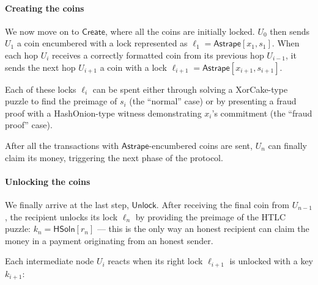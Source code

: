 \documentclass[USenglish,oneside,twocolumn]{article}
\begin{document}
\paragraph*{Creating the coins}

We now move on to $\mathsf{Create}$, where all the coins are initially locked. $U_0$ then sends $U_1$ a coin encumbered with a lock represented as $\ell_1 = \mathsf{Astrape}[x_1,s_1]$. When each hop $U_i$ receives a correctly formatted coin from its previous hop $U_{i-1}$, it sends the next hop $U_{i+1}$ a coin with a lock $\ell_{i+1} = \mathsf{Astrape}[x_{i+1}, s_{i+1}]$.

Each of these locks $\ell_i$ can be spent either through solving a XorCake-type puzzle to find the preimage of $s_i$ (the ``normal'' case) or by presenting a fraud proof with a HashOnion-type witness demonstrating $x_i$'s commitment (the ``fraud proof'' case).

After all the transactions with $\mathsf{Astrape}$-encumbered coins are sent, $U_n$ can finally claim its money, triggering the next phase of the protocol.

\paragraph*{Unlocking the coins}

We finally arrive at the last step, $\mathsf{Unlock}$. After receiving the final coin from $U_{n-1}$, the recipient unlocks its lock $\ell_n$ by providing the preimage of the HTLC puzzle: $k_n = \mathsf{HSoln}[r_n]$ --- this is the only way an honest recipient can claim the money in a payment originating from an honest sender.

Each intermediate node $U_i$ reacts when its right lock $\ell_{i+1}$ is unlocked with a key $k_{i+1}$:
\end{document}
